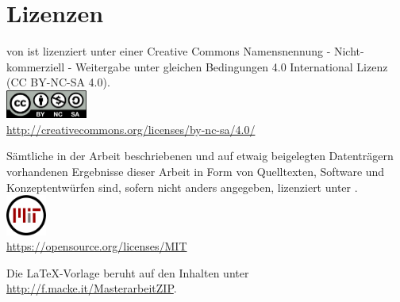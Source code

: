 \chapter*{Lizenzen}

\begin{center}

\vspace*{\fill}

\quotes{\thema} von \autor\space ist lizenziert unter einer Creative Commons Namensnennung - Nicht-kommerziell - Weitergabe unter gleichen Bedingungen 4.0 International Lizenz (CC BY-NC-SA 4.0). \\
\includegraphics[width=0.2\textwidth]{Bilder/by-nc-sa-eu}\\
\url{http://creativecommons.org/licenses/by-nc-sa/4.0/}

\vspace*{\fill}

Sämtliche in der Arbeit beschriebenen und auf etwaig beigelegten Datenträgern
vorhandenen Ergebnisse dieser Arbeit in Form von Quelltexten, Software und
Konzeptentwürfen sind, sofern nicht anders angegeben, lizenziert unter . \\
\includegraphics[width=0.1\textwidth]{Bilder/mit_license}\\
\url{https://opensource.org/licenses/MIT}

\vspace*{\fill}

Die LaTeX-Vorlage beruht auf den Inhalten unter\\
\url{http://f.macke.it/MasterarbeitZIP}.

\vspace*{\fill}

\end{center}
